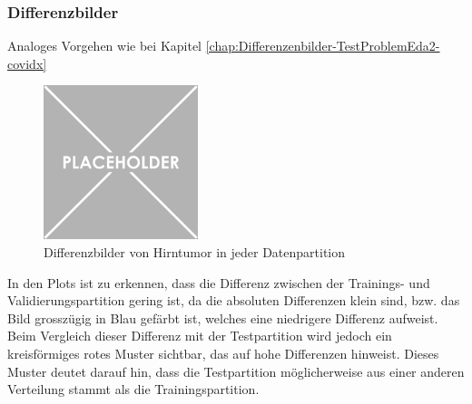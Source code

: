 \newpage


\subsubsection{Differenzbilder} \label{chap:brain-differenzenbilder}
 
Analoges Vorgehen wie bei Kapitel \ref{chap:Differenzenbilder-TestProblemEda2-covidx}


\begin{figure}[ht]
    \centering
    \includegraphics[width=\linewidth, height=4.5cm]{01-images/01-setup/04-placeholder.png}
    \caption{Differenzbilder von Hirntumor in jeder Datenpartition}
    \label{fig:differenzenbilder-datapartition-brain}
\end{figure}


In den Plots ist zu erkennen, dass die Differenz zwischen der Trainings- und Validierungspartition gering ist, da die absoluten Differenzen klein sind, bzw. das Bild grosszügig in Blau gefärbt ist, welches eine niedrigere Differenz aufweist. Beim Vergleich dieser Differenz mit der Testpartition wird jedoch ein kreisförmiges rotes Muster sichtbar, das auf hohe Differenzen hinweist. Dieses Muster deutet darauf hin, dass die Testpartition möglicherweise aus einer anderen Verteilung stammt als die Trainingspartition.

